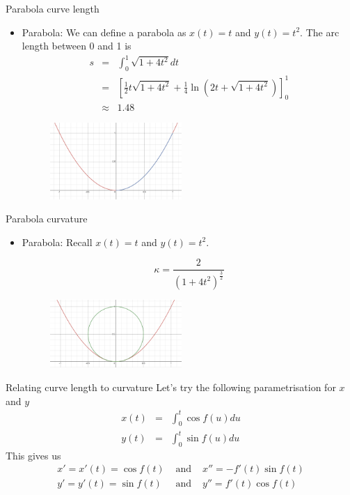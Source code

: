 \documentclass{beamer}
\begin{document}
\begin{frame}{Parabola curve length}
	\begin{itemize}	
			
			\item Parabola: We can define a parabola as $x(t)=t$ and $y(t)=t^2$. The arc length between 0 and 1 is 
			\begin{eqnarray*}
				s &=& \int_{0}^{1} \sqrt{1+4t^2}dt \\ &=& \left[\frac{1}{2} t\sqrt{1+ 4 t^2} +\frac{1}{4} \ln \left(2 t+\sqrt{1+ 4 t^2} \right) \right]_{0}^1 \\
				&\approx&	 1.48
			\end{eqnarray*}
		
	\begin{figure}
		\centering
		\includegraphics[width=50mm, scale=0.4]{Parabola_Arc_Length.png}
	\end{figure}
	\end{itemize}
\end{frame}

\begin{frame}{Parabola curvature}
	\begin{itemize}	
		
		\item Parabola: Recall $x(t)=t$ and $y(t)=t^2$. 
		
		\[
		\kappa = \frac{2}{\left(1 + 4t^2 \right) ^ \frac{3}{2}}
		\]
		
	\begin{figure}
	\centering
	\includegraphics[width=50mm, scale=0.4]{Parabola.png}
\end{figure}

	\end{itemize}
\end{frame}

\begin{frame}{Relating curve length to curvature}
	Let's try the following parametrisation for $x$ and $y$
	\begin{eqnarray*}
		x(t) &=& \int_{0}^{t} \cos f(u) du \\
		y(t) &=& \int_{0}^{t} \sin f(u) du
	\end{eqnarray*}
	This gives us
	\begin{eqnarray*}
		x' = x'(t) = \cos f(t) &\mbox{ and }& x''=-f'(t) \sin f(t) \\
		y' = y'(t) = \sin f(t) &\mbox{ and }& y''=f'(t) \cos f(t)
	\end{eqnarray*}
\end{frame}
\end{document}
